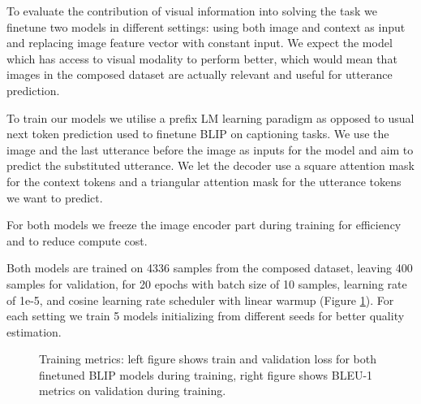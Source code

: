
To evaluate the contribution of visual information into solving the task we finetune two models in different settings: using both image and context as input and replacing image feature vector with constant input. We expect the model which has access to visual modality to perform better, which would mean that images in the composed dataset are actually relevant and useful for utterance prediction.

To train our models we utilise a prefix LM learning paradigm as opposed to usual next token prediction used to finetune BLIP on captioning tasks. We use the image and the last utterance before the image as inputs for the model and aim to predict the substituted utterance. We let the decoder use a square attention mask for the context tokens and a triangular attention mask for the utterance tokens we want to predict.

For both models we freeze the image encoder part during training for efficiency and to reduce compute cost.

Both models are trained on 4336 samples from the composed dataset, leaving 400 samples for validation, for 20 epochs with batch size of 10 samples, learning rate of 1e-5, and cosine learning rate scheduler with linear warmup (Figure \ref{fig:bleu_val}). For each setting we train 5 models initializing from different seeds for better quality estimation.

\begin{figure}[h]
    \centering
    \caption{Training metrics: left figure shows train and validation loss for both finetuned BLIP models during training, right figure shows BLEU-1 metrics on validation during training.}
    \label{fig:bleu_val}
\end{figure}